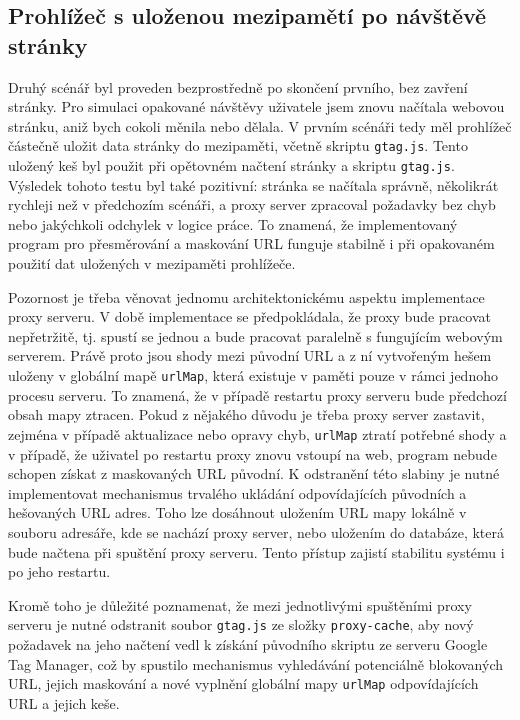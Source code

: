 \subsection*{Prohlížeč s uloženou mezipamětí po návštěvě stránky}
Druhý scénář byl proveden bezprostředně po skončení prvního, bez zavření stránky. Pro simulaci opakované návštěvy uživatele jsem znovu načítala webovou stránku, aniž bych cokoli měnila nebo dělala. V prvním scénáři tedy měl prohlížeč částečně uložit data stránky do mezipaměti, včetně skriptu \texttt{gtag.js}. Tento uložený keš byl použit při opětovném načtení stránky a skriptu \texttt{gtag.js}. Výsledek tohoto testu byl také pozitivní: stránka se načítala správně, několikrát rychleji než v předchozím scénáři, a proxy server zpracoval požadavky bez chyb nebo jakýchkoli odchylek v logice práce. To znamená, že implementovaný program pro přesměrování a maskování URL funguje stabilně i při opakovaném použití dat uložených v mezipaměti prohlížeče.

Pozornost je třeba věnovat jednomu architektonickému aspektu implementace proxy serveru. V době implementace se předpokládala, že proxy bude pracovat nepřetržitě, tj. spustí se jednou a bude pracovat paralelně s fungujícím webovým serverem. Právě proto jsou shody mezi původní URL a z ní vytvořeným hešem uloženy v globální mapě \texttt{urlMap}, která existuje v paměti pouze v rámci jednoho procesu serveru. To znamená, že v případě restartu proxy serveru bude předchozí obsah mapy ztracen. Pokud z nějakého důvodu je třeba proxy server zastavit, zejména v případě aktualizace nebo opravy chyb, \texttt{urlMap} ztratí potřebné shody a v případě, že uživatel po restartu proxy znovu vstoupí na web, program nebude schopen získat z maskovaných URL původní. K odstranění této slabiny je nutné implementovat mechanismus trvalého ukládání odpovídajících původních a hešovaných URL adres. Toho lze dosáhnout uložením URL mapy lokálně v souboru adresáře, kde se nachází proxy server, nebo uložením do databáze, která bude načtena při spuštění proxy serveru. Tento přístup zajistí stabilitu systému i po jeho restartu.

Kromě toho je důležité poznamenat, že mezi jednotlivými spuštěními proxy serveru je nutné odstranit soubor \texttt{gtag.js} ze složky \texttt{proxy-cache}, aby nový požadavek na jeho načtení vedl k získání původního skriptu ze serveru Google Tag Manager, což by spustilo mechanismus vyhledávání potenciálně blokovaných URL, jejich maskování a nové vyplnění globální mapy \texttt{urlMap} odpovídajících URL a jejich keše.

